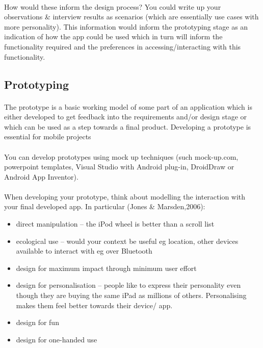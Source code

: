 \documentclass[12pt, a4paper, twoside]{book}
\begin{document}
\paragraph{} How would these inform the design process? You could write up your observations \& interview results as scenarios (which are essentially use cases with more personality). This information would inform the prototyping stage as an indication of how the app could be used which in turn will inform the functionality required and the preferences in accessing/interacting with this functionality.

\subsection{Prototyping}

\paragraph{} The prototype is a basic working model of some part of an application which is either developed to get feedback into the requirements and/or design stage or which can be used as a step towards a final product. Developing a prototype is essential for mobile projects

\paragraph{} You can develop prototypes using mock up techniques (such mock-up.com, powerpoint templates, Visual Studio with Android plug-in, DroidDraw or Android App Inventor). 

\paragraph{} When developing your prototype, think about modelling the interaction with your final developed app. In particular (Jones \& Marsden,2006):
\begin{itemize}
\item direct manipulation – the iPod wheel is better than a scroll list
\item ecological use – would your context be useful eg location, other devices available to interact with eg over Bluetooth
\item design for maximum impact through minimum user effort
\item design for personalisation – people like to express their personality even though they are buying the same iPad as millions of others. Personalising makes them feel better towards their device/ app.
\item design for fun
\item design for one-handed use
\end{itemize}
\end{document}
